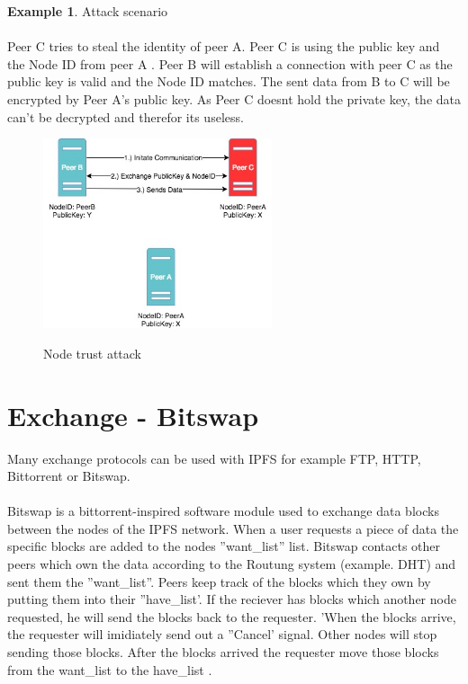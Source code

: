 \documentclass[a4paper,11pt, oneside]{report}
\theoremstyle{definition}
\newtheorem{exmp}{Example}[subsection]
\begin{document}
\begin{exmp}  Attack scenario\\ \\
Peer C tries to steal the identity of peer A. Peer C is using the public key and the Node ID from peer A . Peer B will establish a connection with peer C as the public key is valid and the Node ID matches. The sent data from B to C will be encrypted by Peer A's public key. As Peer C doesnt hold the private key, the data can't be decrypted and therefor its useless.
\begin{figure}[H]
\centering
\includegraphics[width=0.6\textwidth]{img/ipfs_peertrust_scenario_attack.jpg}\\[0.8cm]
\caption[Node trust attack]{Node trust attack}
\end{figure}
\end{exmp}

\newpage

\newpage
\section{Exchange - Bitswap}
Many exchange protocols can be used with IPFS for example FTP, HTTP, Bittorrent or Bitswap.\\ \\
Bitswap is a bittorrent-inspired software module used to exchange data blocks between the nodes of the IPFS network. When a user requests a piece of data the specific blocks are added to the nodes ''want\_list'' list. Bitswap contacts other peers which own the data according to the Routung system (example. DHT) and sent them the ''want\_list''. Peers keep track of the blocks which they own by putting them into their ''have\_list'. If the reciever has blocks which another node requested, he will send the blocks back to the requester. 'When the blocks arrive, the requester will imidiately send out a ''Cancel' signal. Other nodes will stop sending those blocks. After the blocks arrived the requester move those blocks from the want\_list to the have\_list  \cite{bitswap}.
\end{document}
